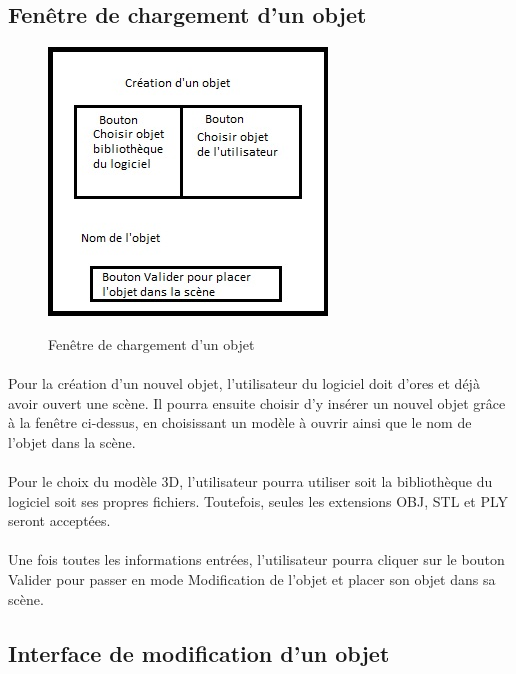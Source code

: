 \subsection{Fenêtre de chargement d'un objet}

\begin{figure}[H]
  \centering
  \includegraphics{chargement}
  \label{fig:chargement}
  \caption{Fenêtre de chargement d'un objet}
\end{figure}

\paragraph{}
Pour la création d’un nouvel objet, l’utilisateur du logiciel doit d’ores et déjà avoir ouvert une scène. Il pourra ensuite choisir d’y insérer un nouvel objet grâce à la fenêtre ci-dessus, en choisissant un modèle à ouvrir ainsi que le nom de l’objet dans la scène.

\paragraph{}
Pour le choix du modèle 3D, l’utilisateur pourra utiliser soit la bibliothèque du logiciel soit ses propres fichiers. Toutefois, seules les extensions OBJ, STL et PLY seront acceptées.

\paragraph{}
Une fois toutes les informations entrées, l’utilisateur pourra cliquer sur le bouton Valider pour passer en mode Modification de l’objet et placer son objet dans sa scène.


\subsection{Interface de modification d'un objet}


